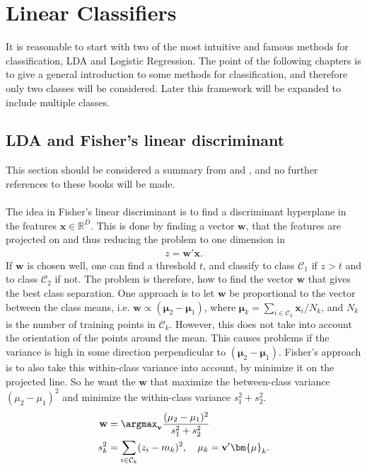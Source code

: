 \section{Linear Classifiers}
\label{sec:Linear Classifiers}
It is reasonable to start with two of the most intuitive and famous methods for classification, LDA and Logistic Regression. The point of the following chapters is to give a general introduction to some methods for classification, and therefore only two classes will be considered. Later this framework will be expanded to include multiple classes.
%
\subsection{LDA and Fisher's linear discriminant}
\label{sub:LDA and Fisher's linear discriminant}
This section should be considered a summary from \cite[ch.~4.1.4]{bishop} and \cite[ch.~4.3]{modstat}, and no further references to these books will be made. \\
\\
The idea in Fisher's linear discriminant is to find a discriminant hyperplane in the features $\mathbf{x}\in \mathbb{R}^D$. This is done by finding a vector $\mathbf{w}$, that the features are projected on and thus reducing the problem to one dimension in 
\begin{align}
  z = \mathbf{w}'\mathbf{x}.
\end{align}
If $\mathbf{w}$ is chosen well, one can find a threshold $t$, and classify to class $\mathcal{C}_1$ if $z > t$ and to class $\mathcal{C}_2$ if not. The problem is therefore, how to find the vector $\mathbf{w}$ that gives the best class separation. One approach is to let $\mathbf{w}$ be proportional to the vector between the class means, i.e. $\mathbf{w} \propto (\bm{\mu}_2 - \bm{\mu}_1)$, where $\bm{\mu}_k = \sum_{i \in \mathcal{C}_k} \mathbf{x}_i/N_k$, and $N_k$ is the number of training points in $\mathcal{C}_k$. However, this does not take into account the orientation of the points around the mean. This causes problems if the variance is high in some direction perpendicular to $(\bm{\mu}_2 - \bm{\mu}_1)$. Fisher's approach is to also take this within-class variance into account, by minimize it on the projected line. So he want the $\mathbf{w}$ that maximize the between-class variance $(\mu_2 - \mu_1)^2$ and minimize the within-class variance $s_1^2 + s_2^2$. 
\begin{align}
  \label{eq:fisherMax} 
  \mathbf{w} &= \argmax_{\mathbf{v}} \frac{(\mu_2 - \mu_1)^2}{s_1^2 + s_2^2} \\
  s_k^2 &= \sum_{i \in \mathcal{C}_k} (z_i - m_k)^2, \quad \mu_k = \mathbf{v}'\bm{\mu}_k.
\end{align}
